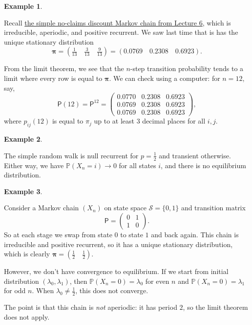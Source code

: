 \documentclass[
  a4paper,
]{article}
\theoremstyle{definition}
\theoremstyle{definition}
\newtheorem{example}{Example}[section]
\theoremstyle{definition}
\theoremstyle{remark}
\begin{document}
\begin{example}
\protect\hypertarget{exm:conv2}{}\label{exm:conv2}

Recall \protect\hyperlink{S06-example1}{the simple no-claims discount Markov chain from Lecture 6}, which is irreducible, aperiodic, and positive recurrent. We saw last time that is has the unique stationary distribution
\[ \boldsymbol\pi = \left(\tfrac1{13} \quad \tfrac{3}{13}\quad \tfrac9{13}\right) = (0.0769\quad 0.2308\quad 0.6923) . \]

From the limit theorem, we see that the \(n\)-step transition probability tends to a limit where every row is equal to \(\boldsymbol\pi\). We can check using a computer: for \(n = 12\), say,
\[ \mathsf P(12) = \mathsf P^{12} = \begin{pmatrix} 0.0770 & 0.2308 & 0.6923 \\ 0.0769 & 0.2308 & 0.6923 \\ 0.0769 & 0.2308 & 0.6923 \end{pmatrix}, \]
where \(p_{ij}(12)\) is equal to \(\pi_j\) up to at least 3 decimal places for all \(i,j\).

\end{example}

\begin{example}
\protect\hypertarget{exm:conv-rw}{}\label{exm:conv-rw}

The simple random walk is null recurrent for \(p = \frac12\) and transient otherwise. Either way, we have \(\mathbb P(X_n = i) \to 0\) for all states \(i\), and there is no equilibrium distribution.

\end{example}

\begin{example}
\protect\hypertarget{exm:conv4}{}\label{exm:conv4}

Consider a Markov chain \((X_n)\) on state space \(\mathcal S = \{0,1\}\) and transition matrix
\[ \mathsf P = \begin{pmatrix} 0 & 1 \\ 1 & 0 \end{pmatrix} . \]
So at each stage we swap from state \(0\) to state \(1\) and back again. This chain is irreducible and positive recurrent, so it has a unique stationary distribution, which is clearly \(\boldsymbol\pi = (\frac12\quad\frac12)\).

However, we don't have convergence to equilibrium. If we start from initial distribution \((\lambda_0, \lambda_1)\), then \(\mathbb P(X_n = 0) = \lambda_0\) for even \(n\) and \(\mathbb P(X_n = 0) = \lambda_1\) for odd \(n\). When \(\lambda_0 \neq \frac12\), this does not converge.

The point is that this chain is \emph{not} aperiodic: it has period \(2\), so the limit theorem does not apply.

\end{example}
\end{document}
